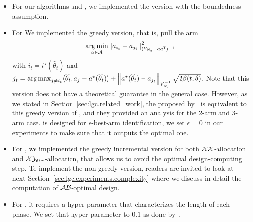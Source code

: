 \begin{itemize}
	\item For our algorithms \LG and \LGC, we implemented the version with the boundedness assumption.
	\item For \LGapE We implemented the greedy version, that is, pull the arm 
	\[
	    \operatorname*{arg\,min}_{a\in\mathcal{A}} \left\lVert a_{i_t}-a_{j_t}\right\rVert_{(V_{N_t}+aa^{\mathsf{\scriptscriptstyle T}})^{-1}}^2
	\]
	with $i_t = i^\star(\hat\theta_t)$ and $j_t = \operatorname*{arg\,max}_{j\neq i_t}\langle\widehat\theta_t,a_{j}-a^\star(\widehat\theta_t)\rangle + \left\lVert a^\star(\widehat\theta_t) - a_{j_t}\right\rVert_{V_{N_t}^{-1}} \sqrt{2\beta(t,\delta)}$. Note that this version does not have a theoretical guarantee in the general case. However, as we stated in Section~\ref{sec:lgc.related_work}, the \GLUCB proposed by~\citet{zaki2019maxoverlap} is equivalent to this greedy version of \LGapE, and they provided an analysis for the 2-arm and 3-arm case. \LGapE is designed for $\epsilon$-best-arm identification, we set $\epsilon=0$ in our experiments to make sure that it outputs the optimal one.
	\item For \XYS, we implemented the greedy incremental version for both $\mathcal{X}\mathcal{X}$-allocation and $\mathcal{X}\mathcal{Y}_{\texttt{dir}}$-allocation, that allows us to avoid the optimal design-computing step. To implement the non-greedy version, readers are invited to look at next Section~\ref{sec:lgc.experiments.complexity} where we discuss in detail the computation of $\mathcal{A}\mathcal{B}$-optimal design.
	\item For \XYA, it requires a hyper-parameter that characterizes the length of each phase. We set that hyper-parameter to $0.1$ as done by~\citet{soare2014linear}.
\end{itemize}



